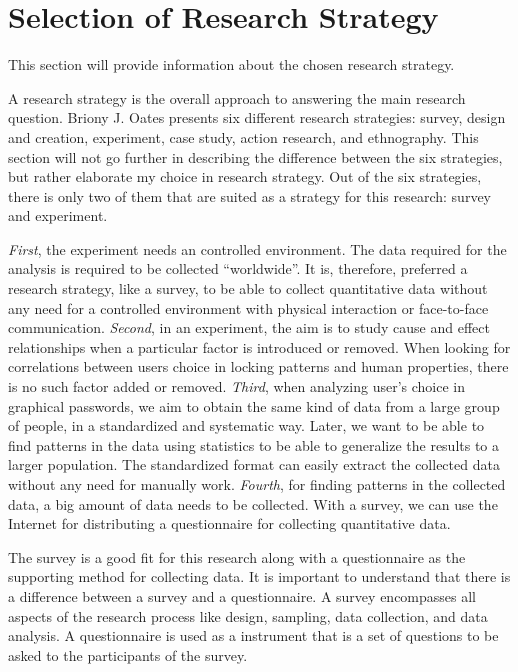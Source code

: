 \section{Selection of Research Strategy} \label{sec:researchstrategy}

  This section will provide information about the chosen research strategy.

  A research strategy is the overall approach to answering the main research question. Briony J. Oates \cite{empiriske} presents six different research strategies: survey, design and creation, experiment, case study, action research, and ethnography. This section will not go further in describing the difference between the six strategies, but rather elaborate my choice in research strategy. Out of the six strategies, there is only two of them that are suited as a strategy for this research: survey and experiment. 

  {\it First}, the experiment needs an controlled environment. The data required for the analysis is required to be collected ``worldwide''. It is, therefore, preferred a research strategy, like a survey, to be able to collect quantitative data without any need for a controlled environment with physical interaction or face-to-face communication.
  {\it Second}, in an experiment, the aim is to study cause and effect relationships when a particular factor is introduced or removed. When looking for correlations between users choice in locking patterns and human properties, there is no such factor added or removed.
  {\it Third}, when analyzing user's choice in graphical passwords, we aim to obtain the same kind of data from a large group of people, in a standardized and systematic way. Later, we want to be able to find patterns in the data using statistics to be able to generalize the results to a larger population. The standardized format can easily extract the collected data without any need for manually work.
  {\it Fourth}, for finding patterns in the collected data, a big amount of data needs to be collected. With a survey, we can use the Internet for distributing a questionnaire for collecting quantitative data. 

  The survey is a good fit for this research along with a questionnaire as the supporting method for collecting data. It is important to understand that there is a difference between a survey and a questionnaire. A survey encompasses all aspects of the research process like design, sampling, data collection, and data analysis. A questionnaire is used as a instrument that is a set of questions to be asked to the participants of the survey.


